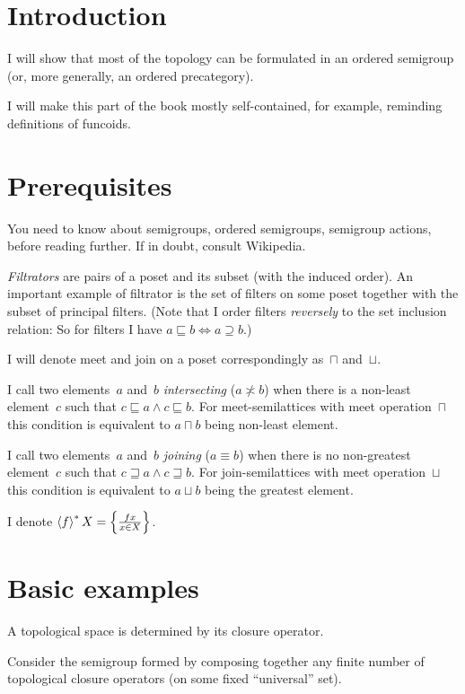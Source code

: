 \chapter{Introduction}

I will show that most of the topology can be formulated in an ordered semigroup (or, more generally, an ordered precategory).

I will make this part of the book mostly self-contained, for example, reminding definitions of funcoids.

\chapter{Prerequisites}

You need to know about semigroups, ordered semigroups, semigroup actions, before reading further. If in doubt, consult Wikipedia.

\emph{Filtrators} are pairs of a poset and its subset (with the induced order). An important example of filtrator is the set of filters on some poset together with the subset of principal filters. (Note that I order filters \emph{reversely} to the set inclusion relation: So for filters I have $a\sqsubseteq b \Leftrightarrow a\supseteq b$.)

I will denote meet and join on a poset correspondingly as~$\sqcap$ and~$\sqcup$.

I call two elements~$a$ and~$b$ \emph{intersecting} ($a\nasymp b$) when there is a non-least element~$c$ such that $c\sqsubseteq a\land c\sqsubseteq b$. For meet-semilattices with meet operation~$\sqcap$ this condition is equivalent to $a\sqcap b$ being non-least element.

I call two elements~$a$ and~$b$ \emph{joining} ($a\equiv b$) when there is no non-greatest element~$c$ such that $c\sqsupseteq a\land c\sqsupseteq b$. For join-semilattices with meet operation~$\sqcup$ this condition is equivalent to $a\sqcup b$ being the greatest element.

I denote $\left\langle f\right\rangle ^{\ast}X = \left\{ \frac{fx}{x\in X}\right\}$.

\chapter{Basic examples}

A topological space is determined by its closure operator.

Consider the semigroup formed by composing together any finite number of topological closure operators (on some fixed ``universal'' set).

